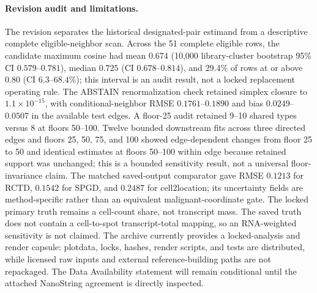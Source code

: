 \paragraph{Revision audit and limitations.} The revision separates the historical designated-pair estimand from a descriptive complete eligible-neighbor scan. Across the 51 complete eligible rows, the candidate maximum cosine had mean \(0.674\) (10,000 library-cluster bootstrap 95\% CI \(0.579\)--\(0.781\)), median \(0.725\) (CI \(0.678\)--\(0.814\)), and 29.4\% of rows at or above \(0.80\) (CI \(6.3\)--\(68.4\%\)); this interval is an audit result, not a locked replacement operating rule. The ABSTAIN renormalization check retained simplex closure to \(1.1\times10^{-15}\), with conditional-neighbor RMSE \(0.1761\)--\(0.1890\) and bias \(0.0249\)--\(0.0507\) in the available test edges. A floor-25 audit retained 9--10 shared types versus 8 at floors 50--100. Twelve bounded downstream fits across three directed edges and floors 25, 50, 75, and 100 showed edge-dependent changes from floor 25 to 50 and identical estimates at floors 50--100 within edge because retained support was unchanged; this is a bounded sensitivity result, not a universal floor-invariance claim. The matched saved-output comparator gave RMSE \(0.1213\) for RCTD, \(0.1542\) for SPGD, and \(0.2487\) for cell2location; its uncertainty fields are method-specific rather than an equivalent malignant-coordinate gate. The locked primary truth remains a cell-count share, not transcript mass. The saved truth does not contain a cell-to-spot transcript-total mapping, so an RNA-weighted sensitivity is not claimed. The archive currently provides a locked-analysis and render capsule: plotdata, locks, hashes, render scripts, and tests are distributed, while licensed raw inputs and external reference-building paths are not repackaged. The Data Availability statement will remain conditional until the attached NanoString agreement is directly inspected.
